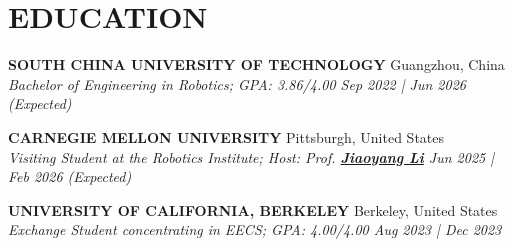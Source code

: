 \documentclass[a4paper,9pt]{extarticle}
\begin{document}
\section*{{\textbf{\fontsize{14pt}{8pt}\selectfont E}\textbf{\scshape DUCATION}}}
\textbf{SOUTH CHINA UNIVERSITY OF TECHNOLOGY} \hfill Guangzhou, China\\ %
\textit{Bachelor of Engineering in Robotics; GPA: 3.86/4.00  \hfill Sep 2022 | Jun 2026 (Expected)} %
\par\vspace{4pt}\noindent
\textbf{CARNEGIE MELLON UNIVERSITY} \hfill Pittsburgh, United States \\ %
\textit{Visiting Student at the Robotics Institute; Host: Prof. {\href{https://jiaoyangli.me/}{\textbf{Jiaoyang Li}}}  \hfill Jun 2025 | Feb 2026 (Expected)}  %
\par\vspace{4pt}\noindent
\textbf{UNIVERSITY OF CALIFORNIA, BERKELEY} \hfill Berkeley, United States\\ %
\textit{Exchange Student concentrating in EECS; GPA: 4.00/4.00 \hfill   Aug 2023 | Dec 2023} %



\end{document}
